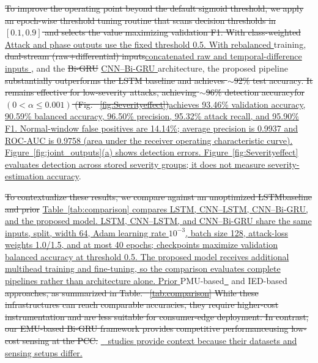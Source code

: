 \documentclass[conference,onecolumn,letterpaper]{IEEEtran} %
\providecommand{\DIFadd}[1]{{\protect\color{blue} \sf #1}} %
\providecommand{\DIFdel}[1]{{\protect\color{red} \scriptsize #1}} %
\providecommand{\DIFaddbegin}{} %
\providecommand{\DIFaddend}{} %
\providecommand{\DIFdelbegin}{} %
\providecommand{\DIFdelend}{} %
\renewcommand{\DIFadd}[1]{{\protect\color{blue}\protect\uline{#1}}}
\renewcommand{\DIFdel}[1]{{\protect\color{red}\protect\sout{#1}}}
\begin{document}
\DIFdelbegin \DIFdel{To improve the operating point beyond the default sigmoid threshold, we apply an epoch-wise threshold tuning routine that scans decision thresholds in $[0.1,0.9]$ and selects the value maximizing validation F1. With class-weighted }\DIFdelend \DIFaddbegin \DIFadd{Attack and phase outputs use the fixed threshold 0.5. With rebalanced }\DIFaddend training, \DIFdelbegin \DIFdel{dual-stream (raw+differential) inputs}\DIFdelend \DIFaddbegin \DIFadd{concatenated raw and temporal-difference inputs }\DIFaddend , and the \DIFdelbegin \DIFdel{Bi-GRU }\DIFdelend \DIFaddbegin \DIFadd{CNN--Bi-GRU }\DIFaddend architecture, the proposed pipeline \DIFdelbegin \DIFdel{substantially outperforms the LSTM baseline and achieves $\sim$92\% test accuracy. It remains effective for low-severity attacks, achieving $\sim$96\% detection accuracyfor $(0<\alpha \le 0.001)$ (Fig. ~\mbox{\ref{fig:Severityeffect}})}\DIFdelend \DIFaddbegin \DIFadd{achieves 93.46\% validation accuracy, 90.59\% balanced accuracy, 96.50\% precision, 95.32\% attack recall, and 95.90\% F1. Normal-window false positives are 14.14\%; average precision is 0.9937 and ROC-AUC is 0.9758 (area under the receiver operating characteristic curve). Figure~\mbox{\ref{fig:joint_outputs}}(a) shows detection errors. Figure~\mbox{\ref{fig:Severityeffect}} evaluates detection across stored severity groups; it does not measure severity-estimation accuracy}\DIFaddend .


\DIFdelbegin \DIFdel{To contextualize these results, we compare against an unoptimized LSTMbaseline and prior }\DIFdelend \DIFaddbegin \DIFadd{Table~\mbox{\ref{tab:comparison}} compares LSTM, CNN--LSTM, CNN--Bi-GRU, and the proposed model. LSTM, CNN--LSTM, and CNN--Bi-GRU share the same inputs, split, width 64, Adam learning rate $10^{-3}$, batch size 128, attack-loss weights 1.0/1.5, and at most 40 epochs; checkpoints maximize validation balanced accuracy at threshold 0.5. The proposed model receives additional multihead training and fine-tuning, so the comparison evaluates complete pipelines rather than architecture alone. Prior }\DIFaddend PMU-based\DIFaddbegin \DIFadd{~}\DIFaddend \mbox{\cite{guha}} and IED-based\DIFdelbegin \DIFdel{\mbox{\cite{aljohani2024}} approaches, as summarized in Table. ~\mbox{\ref{tab:comparison}} While these infrastructures can reach comparable accuracies, they require higher-cost instrumentation and are less suitable for consumer-edge deployment. In contrast, our EMU-based Bi-GRU framework provides competitive performanceusing low-cost sensing at the PCC. }\DIFdelend \DIFaddbegin \DIFadd{~\mbox{\cite{aljohani2024}} studies provide context because their datasets and sensing setups differ.
}
\end{document}
